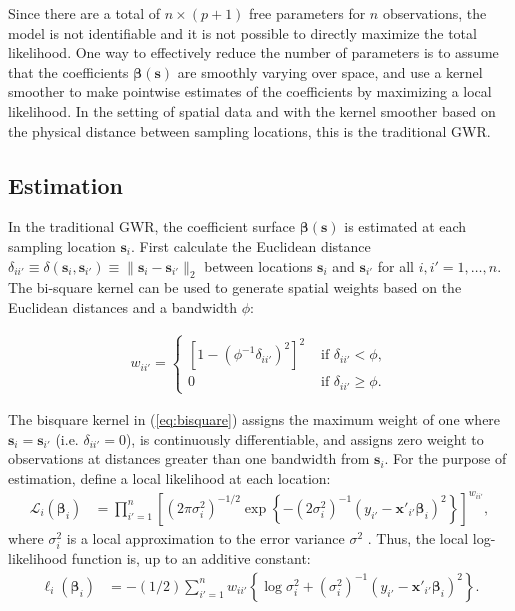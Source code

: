 \documentclass[authoryear, review, 11pt]{elsarticle}
\begin{document}
	Since there are a total of $n \times (p+1)$ free parameters for $n$ observations, the model is not identifiable and it is not possible to directly maximize the total likelihood. One way to effectively reduce the number of parameters is to assume that the coefficients $\bm{\beta}(\bm{s})$ are smoothly varying over space, and use a kernel smoother to make pointwise estimates of the coefficients by maximizing a local likelihood. In the setting of spatial data and with the kernel smoother based on the physical distance between sampling locations, this is the traditional GWR.
		
	\subsection{Estimation}		
	In the traditional GWR, the coefficient surface $\bm{\beta}(\bm{s})$ is estimated at each sampling location $\bm{s}_i$. First calculate the Euclidean distance $\delta_{ii'} \equiv \delta\left(\bm{s}_i, \bm{s}_{i'}\right) \equiv \|\bm{s}_i  -\bm{s}_{i'}\|_2$ between locations $\bm{s}_i$ and $\bm{s}_{i'}$ for all $i, i' = 1, \dots, n$. The bi-square kernel can be used to generate spatial weights based on the Euclidean distances and a bandwidth $\phi$:
	
	\begin{align}\label{eq:bisquare}
		w_{ii'} = \begin{cases} \left[1-\left(\phi^{-1}\delta_{ii'}\right)^2\right]^2 &\mbox{ if } \delta_{ii'} < \phi, \\ 0 &\mbox{ if } \delta_{ii'} \geq \phi. \end{cases}
	\end{align}
	
	The bisquare kernel in (\ref{eq:bisquare}) assigns the maximum weight of one where $\bm{s}_i = \bm{s}_{i'}$ (i.e. $\delta_{ii'}=0$), is continuously differentiable, and assigns zero weight to observations at distances greater than one bandwidth from $\bm{s}_i$. For the purpose of estimation, define a local likelihood at each location:
	\begin{align}\label{eq:local-likelihood}
		\mathcal{L}_i \left(\bm{\beta}_i \right) &= \prod_{i'=1}^n \left[ \left(2 \pi \sigma^2_i  \right)^{-1/2}  \exp\left\{-\left(2 \sigma^2_i\right)^{-1}  \left(y_{i'} - \bm{x}'_{i'} \bm{\beta}_i \right)^2 \right\} \right] ^ {w_{ii'}},
	\end{align}			
	where $\sigma_i^2$ is a local approximation to the error variance $\sigma^2$ \citep{Fotheringham:2002}. Thus, the local log-likelihood function is, up to an additive constant:
	\begin{align}\label{eq:local-log-likelihood}
		\ell_i\left(\bm{\beta}_i\right) &= -(1/2) \sum_{i'=1}^n w_{ii'} \left\{ \log{\sigma^2_i}  + \left(\sigma^2_i\right)^{-1}  \left(y_{i'} - \bm{x}'_{i'} \bm{\beta}_i \right)^2 \right\}.
	\end{align}
	
\end{document}
